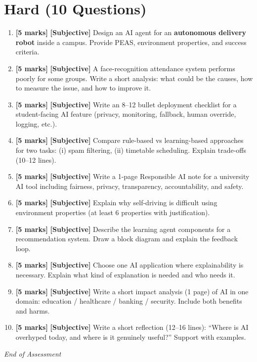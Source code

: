 \documentclass[11pt,a4paper]{article}
\newcommand{\HMarks}{\textbf{[5 marks]} }
\begin{document}
\section*{Hard (10 Questions)}
\begin{enumerate}[label=\textbf{H\arabic*.}, leftmargin=*]
  \item \HMarks \textbf{[Subjective]} Design an AI agent for an \textbf{autonomous delivery robot} inside a campus.
    Provide PEAS, environment properties, and success criteria.

  \item \HMarks \textbf{[Subjective]} A face-recognition attendance system performs poorly for some groups.
    Write a short analysis: what could be the causes, how to measure the issue, and how to improve it.

  \item \HMarks \textbf{[Subjective]} Write an 8--12 bullet deployment checklist for a student-facing AI feature
    (privacy, monitoring, fallback, human override, logging, etc.).

  \item \HMarks \textbf{[Subjective]} Compare rule-based vs learning-based approaches for two tasks:
    (i) spam filtering, (ii) timetable scheduling. Explain trade-offs (10--12 lines).

  \item \HMarks \textbf{[Subjective]} Write a 1-page Responsible AI note for a university AI tool
    including fairness, privacy, transparency, accountability, and safety.

  \item \HMarks \textbf{[Subjective]} Explain why self-driving is difficult using environment properties
    (at least 6 properties with justification).

  \item \HMarks \textbf{[Subjective]} Describe the learning agent components for a recommendation system.
    Draw a block diagram and explain the feedback loop.

  \item \HMarks \textbf{[Subjective]} Choose one AI application where explainability is necessary.
    Explain what kind of explanation is needed and who needs it.

  \item \HMarks \textbf{[Subjective]} Write a short impact analysis (1 page) of AI in one domain:
    education / healthcare / banking / security. Include both benefits and harms.

  \item \HMarks \textbf{[Subjective]} Write a short reflection (12--16 lines):
    ``Where is AI overhyped today, and where is it genuinely useful?'' Support with examples.
\end{enumerate}

\vfill
\noindent\textit{End of Assessment}
\end{document}
